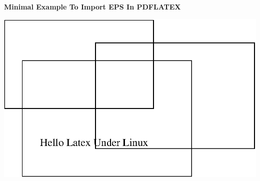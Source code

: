 \documentclass[11pt]{article}
\begin{document}
{\bfseries Minimal Example To Import EPS In PDFLATEX}
\begin{center}
\includegraphics[width=1.0\textwidth]{hellolatex.eps}
\end{center}
\end{document}

